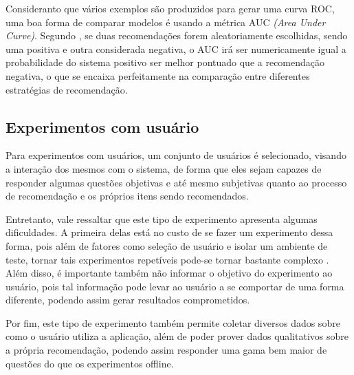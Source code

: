 Consideranto que vários exemplos são produzidos para gerar uma curva ROC, uma
boa forma de comparar modelos é usando a métrica AUC \textit{(Area Under
Curve)}. Segundo , se duas recomendações forem
aleatoriamente escolhidas, sendo uma positiva e outra considerada negativa, o
AUC irá ser numericamente igual a probabilidade do sistema positivo ser melhor
pontuado que a recomendação negativa, o que se encaixa perfeitamente na
comparação entre diferentes estratégias de recomendação.

\subsection{Experimentos com usuário}

Para experimentos com usuários, um conjunto de usuários é selecionado, visando
a interação dos mesmos com o sistema, de forma que eles sejam capazes de responder algumas
questões objetivas e até mesmo subjetivas quanto ao processo de recomendação e
os próprios itens sendo recomendados.

Entretanto, vale ressaltar que este tipo de experimento apresenta algumas
dificuldades. A primeira delas está no custo de se fazer um experimento dessa
forma, pois além de fatores como seleção de usuário e isolar um ambiente de
teste, tornar tais experimentos repetíveis pode-se tornar bastante complexo
\cite{shani2011evaluating}. Além disso, é importante também não informar o
objetivo do experimento ao usuário, pois tal informação pode levar ao usuário a
se comportar de uma forma diferente, podendo assim gerar resultados
comprometidos.

Por fim, este tipo de experimento também permite coletar diversos dados sobre
como o usuário utiliza a aplicação, além de poder prover dados qualitativos
sobre a própria recomendação, podendo assim responder uma gama bem maior de
questões do que os experimentos offline.
